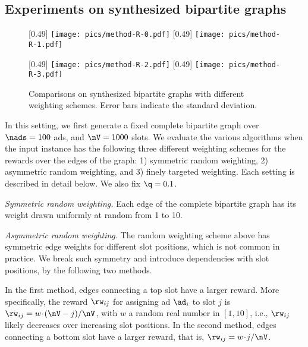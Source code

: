 \subsection{Experiments on synthesized bipartite graphs}\label{sec:exp:bip}

\begin{figure}[t]
	\centering
	[0.49\columnwidth]{
		{\texttt{[image: pics/method-R-0.pdf]}}
	}
	\hfill
	[0.49\columnwidth]{
		{\texttt{[image: pics/method-R-1.pdf]}}
	}
	
	[0.49\columnwidth]{
		{\texttt{[image: pics/method-R-2.pdf]}}
	}
	\hfill
	[0.49\columnwidth]{
		{\texttt{[image: pics/method-R-3.pdf]}}
	}
	\caption{Comparisons on synthesized bipartite graphs with different weighting schemes. Error bars indicate the standard deviation.}
	\label{fig:exp:bip}
\end{figure}


In this setting, we first generate a fixed complete bipartite graph over
$\nads=100$ ads, and
$\nV=1000$ slots.
We evaluate the various algorithms
when the input instance has the following three different 
weighting schemes for the rewards over the edges of the graph:
1) symmetric random weighting,
2) asymmetric random weighting, and
3) finely targeted weighting.
Each setting is described in detail below.
We also fix $\q = 0.1$. %


\smallskip
\noindent
\emph{Symmetric random weighting.}
Each edge of the complete bipartite graph has its weight drawn uniformly at random from 1 to 10.

\smallskip
\noindent
\emph{Asymmetric random weighting.}
The random weighting scheme above
has symmetric edge weights for different slot positions,
which is not common in practice.
We break such symmetry and introduce dependencies with slot positions, by the following two methods.

In the first method, edges connecting a top slot have a larger reward.
More specifically, the reward $\rw_{ij}$ for assigning ad $\ad_i$ to slot $j$ is %
$\rw_{ij} = w \!\cdot\! (\nV - j) / \nV$, with $w$ a random real number in $[1,10]$, i.e., $\rw_{ij}$ likely decreases over increasing slot positions.
In the second method, edges connecting a bottom slot have a larger reward, that is, 
$\rw_{ij} = w \!\cdot\! j / \nV$.

